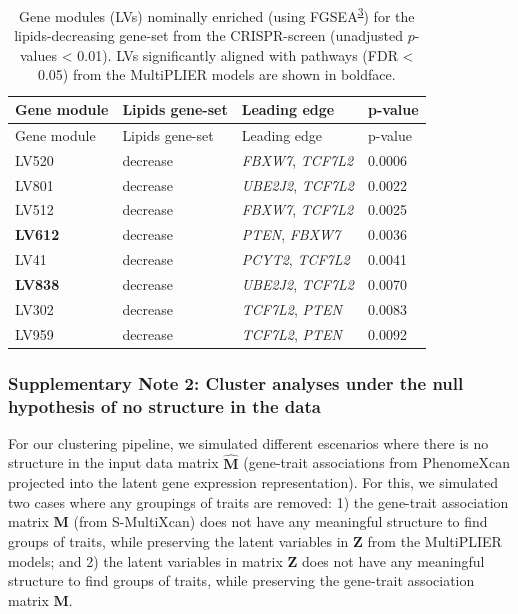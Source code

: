 \documentclass[
  a4paper,
]{article}
\newenvironment{tablenos:tagged-table}[1][]{
  \let\oldtablename\tablename
  \renewcommand{\tablename}{Supplementary Table}
}{
  \let\tablename\oldtablename
}
\begin{document}
\begin{tablenos:tagged-table}[S2]

\begin{longtable}[]{@{}llll@{}}
\caption{Gene modules (LVs) nominally enriched (using FGSEA\textsuperscript{\protect\hyperlink{ref-Z8WXLD67}{3}}) for the lipids-decreasing gene-set from the CRISPR-screen (unadjusted \(p\)-values \textless{} 0.01).
LVs significantly aligned with pathways (FDR \textless{} 0.05) from the MultiPLIER models are shown in boldface.
\label{tbl:sup:lipids_crispr:modules_enriched_decrease}}\label{tbl:sup:lipids_crispr:modules_enriched_decrease}\tabularnewline
\toprule()
Gene module & Lipids gene-set & Leading edge & p-value \\
\midrule()
\endfirsthead
\toprule()
Gene module & Lipids gene-set & Leading edge & p-value \\
\midrule()
\endhead
LV520 & decrease & \emph{FBXW7}, \emph{TCF7L2} & 0.0006 \\
LV801 & decrease & \emph{UBE2J2}, \emph{TCF7L2} & 0.0022 \\
LV512 & decrease & \emph{FBXW7}, \emph{TCF7L2} & 0.0025 \\
\textbf{LV612} & decrease & \emph{PTEN}, \emph{FBXW7} & 0.0036 \\
LV41 & decrease & \emph{PCYT2}, \emph{TCF7L2} & 0.0041 \\
\textbf{LV838} & decrease & \emph{UBE2J2}, \emph{TCF7L2} & 0.0070 \\
LV302 & decrease & \emph{TCF7L2}, \emph{PTEN} & 0.0083 \\
LV959 & decrease & \emph{TCF7L2}, \emph{PTEN} & 0.0092 \\
\bottomrule()
\end{longtable}

\end{tablenos:tagged-table}

\clearpage

\hypertarget{sm:clustering:null_sim}{%
\subsubsection{Supplementary Note 2: Cluster analyses under the null hypothesis of no structure in the data}\label{sm:clustering:null_sim}}

For our clustering pipeline, we simulated different escenarios where there is no structure in the input data matrix \(\hat{\mathbf{M}}\) (gene-trait associations from PhenomeXcan projected into the latent gene expression representation).
For this, we simulated two cases where any groupings of traits are removed:
1) the gene-trait association matrix \(\mathbf{M}\) (from S-MultiXcan) does not have any meaningful structure to find groups of traits, while preserving the latent variables in \(\mathbf{Z}\) from the MultiPLIER models;
and 2) the latent variables in matrix \(\mathbf{Z}\) does not have any meaningful structure to find groups of traits, while preserving the gene-trait association matrix \(\mathbf{M}\).
\end{document}
